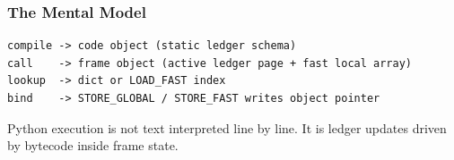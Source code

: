 \subsubsection{The Mental Model}

\begin{verbatim}
compile -> code object (static ledger schema)
call    -> frame object (active ledger page + fast local array)
lookup  -> dict or LOAD_FAST index
bind    -> STORE_GLOBAL / STORE_FAST writes object pointer
\end{verbatim}

Python execution is not text interpreted line by line. It is ledger updates driven by bytecode inside frame state.

